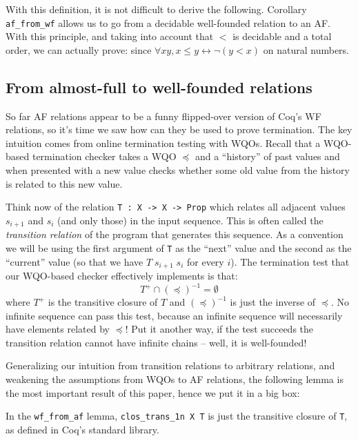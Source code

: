 \documentclass{llncs}
\begin{document}
With this definition, it is not difficult to derive the following.
Corollary \lstinline|af_from_wf| allows us to go from a 
decidable well-founded relation to an AF. With this principle, and taking into account 
that $<$ is decidable and a total order, we can actually prove:
since $\forall x y, x \leq y \leftrightarrow \lnot (y < x)$ on natural numbers.

\subsection{From almost-full to well-founded relations}\label{sect:af-to-wf}

So far AF relations appear to be a funny flipped-over version of Coq's WF relations, so 
it's time we saw how can they be used to prove termination. The key intuition comes
from online termination testing with WQOs. Recall that a WQO-based termination
checker takes a WQO $\preceq$ and a ``history'' of past values and when presented with a new 
value checks whether some old value from the history is related to this new value. 

Think now of the relation \lstinline|T : X -> X -> Prop| which relates all adjacent 
values $s_{i+1}$ and $s_{i}$ (and only those) in the input sequence. This is often called the {\em transition relation} 
of the program that generates this sequence. As a convention we will be using the first argument of \lstinline|T| as
the ``next'' value and the second as the ``current'' value (so that we have $T\;s_{i+1}\;s_i$ for every $i$). 
The termination test that our WQO-based checker effectively implements is that:
\[ T^{+} \cap  (\preceq)^{-1} = \emptyset \]
where $T^{+}$ is the transitive closure of $T$ and $(\preceq)^{-1}$ is just the inverse of $\preceq$. No infinite 
sequence can pass this test, because an infinite sequence will necessarily have elements related by $\preceq$! 
Put it another way, if the test succeeds the transition relation cannot have infinite chains -- well, it 
is well-founded!

Generalizing our intuition from transition relations to arbitrary relations, and weakening the 
assumptions from WQOs to AF relations, the following lemma is the most important result of this 
paper, hence we put it in a big box:
\begin{center}
\end{center}
In the \lstinline|wf_from_af| lemma, \lstinline|clos_trans_1n X T| is just the 
transitive closure of \lstinline|T|, as defined in Coq's standard library. 
\end{document}
